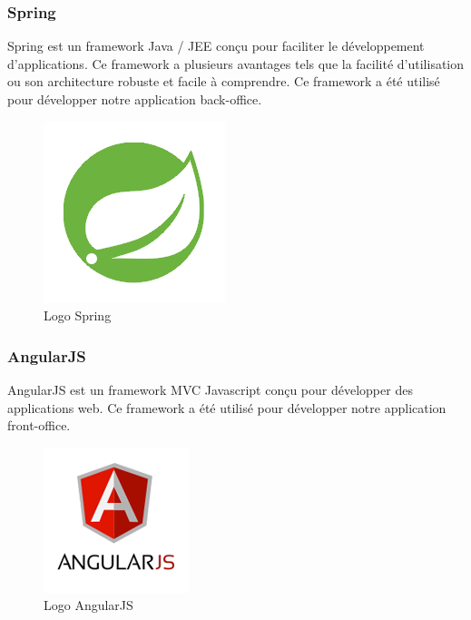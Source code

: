 \subsubsection{Spring}
\noindent\begin{minipage}{0.69\textwidth}
Spring est un framework Java / JEE conçu pour faciliter le développement d'applications. Ce framework a plusieurs avantages tels que la facilité d'utilisation ou son architecture robuste et facile à comprendre. Ce framework a été utilisé pour développer notre application back-office.
\end{minipage}
\begin{minipage}{0.3\textwidth}
\begin{figure}[H]
  \centering
  \includegraphics[scale=0.35]{figures/logo/spring.png}
  \caption{Logo Spring}
  \label{code41}
\end{figure}
\end{minipage}
\subsubsection{AngularJS}
\noindent\begin{minipage}{0.69\textwidth}
AngularJS est un framework MVC \footnotemark Javascript conçu pour développer des applications web. Ce framework a été utilisé pour développer notre application front-office.
\end{minipage}
\begin{minipage}{0.3\textwidth}
\begin{figure}[H]
  \centering
  \includegraphics[scale=0.5]{figures/logo/angularjs.png}
  \caption{Logo AngularJS}
  \label{code42}
\end{figure}
\end{minipage}
